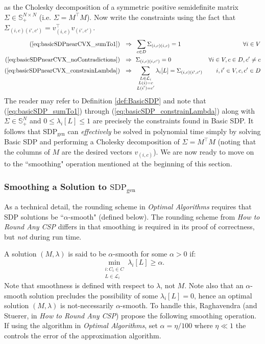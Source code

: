 as the Cholesky decomposition of a symmetric positive semidefinite matrix $\Sigma \in \mathbb{S}_+^{N \times N}$ (i.e. $\Sigma = M^\intercal M$). Now write the constraints using the fact that $\Sigma_{(i,c)(i',c')} = v_{(i,c)}^\intercal v_{(i',c')}$.
\begin{alignat}{2}
(\ref{eq:basicSDPnearCVX_sumTo1}) ~~\Rightarrow & ~~\sum_{c \in D} \Sigma_{(i,c)(i,c)} = 1 & \forall i \in V \label{eq:basicSDP_sumTo1} \\
(\ref{eq:basicSDPnearCVX_noContradictions}) ~~\Rightarrow &~~\Sigma_{(i,c)(i,c')} = 0 & \forall i \in V, c \in D, c' \neq c \label{eq:basicSDP_noContradictions} \\
(\ref{eq:basicSDPnearCVX_constrainLambda})~~ \Rightarrow & ~~\sum_{\substack{L \in \mathcal{L}_i \\ L(i) = c \\ L(i') = c' }} \lambda_i[L] =\Sigma_{(i,c)(i',c')} &  i,i' \in V, c,c' \in D \label{eq:basicSDP_constrainLambda}
\end{alignat}
The reader may refer to Definition \ref{def:BasicSDP} and note that (\ref{eq:basicSDP_sumTo1}) through (\ref{eq:basicSDP_constrainLambda}) along with $\Sigma \in \mathbb{S}^N_+$ and $0 \leq \lambda_i[L] \leq 1$ are precisely the constraints found in Basic SDP. It follows that $\text{SDP}_{\text{gen}}$ can \textit{effectively} be solved in polynomial time simply by solving Basic SDP and performing a Cholesky decomposition of $\Sigma = M^\intercal M$ (noting that the columns of $M$ are the desired vectors $v_{(i,c)}$). We are now ready to move on to the ``smoothing" operation mentioned at the beginning of this section. 

\subsubsection{Smoothing a Solution to $\text{SDP}_{\text{gen}}$}
As a technical detail, the rounding scheme in \textit{Optimal Algorithms} requires that SDP solutions be ``$\alpha$-smooth" (defined below). The rounding scheme from \textit{How to Round Any CSP} differs in that smoothing is required in its proof of correctness, but \textit{not} during run time. 

A solution $(M,\lambda)$ is said to be $\alpha$-smooth for some $\alpha >0 $ if:
\begin{equation}
\min_{\substack{ i : C_i \in C \\ L \in \mathcal{L}_i }} \lambda_i[L] \geq \alpha.
\end{equation}
Note that smoothness is defined with respect to $\lambda$, not $M$. Note also that an $\alpha$-smooth solution precludes the possibility of some $\lambda_i[L] = 0$, hence an optimal solution $(M, \lambda)$ is not-necessarily $\alpha$-smooth. To handle this, Raghavendra (and Stuerer, in \textit{How to Round Any CSP}) propose the following smoothing operation. If using the algorithm in \textit{Optimal Algorithms}, set $\alpha = \eta / 100$ where $\eta \ll 1$ the controls the error of the approximation algorithm.

